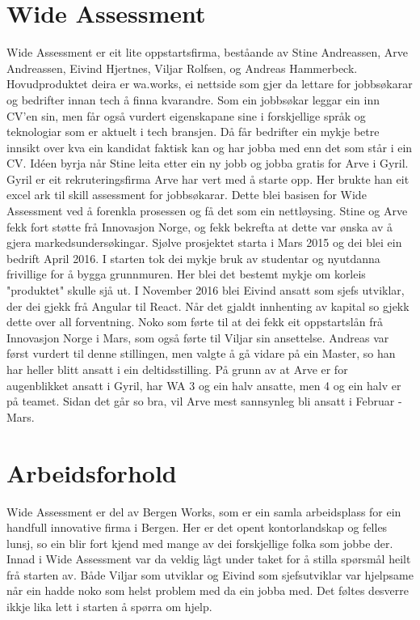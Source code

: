 \documentclass[12pt]{article}
\begin{document}
\section{Wide Assessment}

Wide Assessment er eit lite oppstartsfirma, beståande av Stine Andreassen,
Arve Andreassen, Eivind Hjertnes, Viljar Rolfsen, og Andreas Hammerbeck.
Hovudproduktet deira er wa.works, ei nettside som gjer da lettare for jobbsøkarar
og bedrifter innan tech å finna kvarandre. Som ein jobbsøkar leggar ein inn CV'en
sin, men får også vurdert eigenskapane sine i forskjellige språk og teknologiar
som er aktuelt i tech bransjen. Då får bedrifter ein mykje betre innsikt over
kva ein kandidat faktisk kan og har jobba med enn det som står i ein CV.
Idéen byrja når Stine leita etter ein ny jobb og jobba gratis for Arve i Gyril.
Gyril er eit rekruteringsfirma Arve har vert med å starte opp. Her brukte han
eit excel ark til skill assessment for jobbsøkarar. Dette blei basisen for Wide
Assessment ved å forenkla prosessen og få det som ein nettløysing. Stine og Arve
fekk fort støtte frå Innovasjon Norge, og fekk bekrefta at dette var ønska av å
gjera markedsundersøkingar. Sjølve prosjektet starta i Mars 2015 og dei blei ein
bedrift April 2016. I starten tok dei mykje bruk av studentar og nyutdanna frivillige
for å bygga grunnmuren. Her blei det bestemt mykje om korleis "produktet" skulle
sjå ut. I November 2016 blei Eivind ansatt som sjefs utviklar, der dei gjekk frå
Angular til React. Når det gjaldt innhenting av kapital so gjekk dette over all
forventning. Noko som førte til at dei fekk eit oppstartslån frå Innovasjon Norge
i Mars, som også førte til Viljar sin ansettelse. Andreas var først vurdert til
denne stillingen, men valgte å gå vidare på ein Master, so han har heller blitt
ansatt i ein deltidsstilling. På grunn av at Arve er for augenblikket ansatt i
Gyril, har WA 3 og ein halv ansatte, men 4 og ein halv er på teamet. Sidan det går so
bra, vil Arve mest sannsynleg bli ansatt i Februar - Mars.

\section{Arbeidsforhold}

Wide Assessment er del av Bergen Works, som er ein samla arbeidsplass for ein
handfull innovative firma i Bergen. Her er det opent kontorlandskap og felles
lunsj, so ein blir fort kjend med mange av dei forskjellige folka som jobbe der.
Innad i Wide Assessment var da veldig lågt under taket for å stilla spørsmål heilt
frå starten av. Både Viljar som utviklar og Eivind som sjefsutviklar var hjelpsame
når ein hadde noko som helst problem med da ein jobba med. Det føltes desverre ikkje
lika lett i starten å spørra om hjelp.
\end{document}
